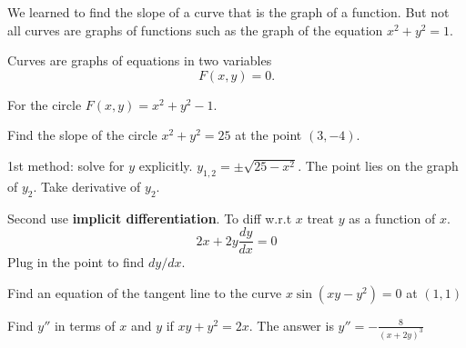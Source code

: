 \documentclass[../main.tex]{subfiles}
\begin{document}
We learned to find the slope of a curve that is the graph of a function. But not all curves are graphs of functions such as the graph of the equation $x^2 + y^2 = 1$.

Curves are graphs of equations in two variables
\[
    F(x, y) = 0.
\]

For the circle $F(x, y) = x^2 + y^2 -1$.


\begin{example}
    Find the slope of the circle $x^2 + y^2 = 25$ at the point $(3, -4)$.

    1st method: solve for $y$ explicitly. $y_{1, 2} = \pm \sqrt{25 - x^2}$. The point lies on the graph of $y_2$. Take derivative of $y_2$.

    Second use \textbf{implicit differentiation}. To diff w.r.t $x$ treat $y$ as a function of $x$.
    \[
        2x + 2y \frac{dy}{dx} = 0
    \]
    Plug in the point to find $dy/dx$.
\end{example}

\begin{example}
    Find an equation of the tangent line to the curve $x \sin(xy - y^2) = 0$ at $(1, 1)$
\end{example}

\begin{example}
    Find $y''$ in terms of $x$ and $y$ if $x y + y^2 = 2x$. The answer is $y'' = -\frac{8}{(x+2y)^3}$
\end{example}
\end{document}
